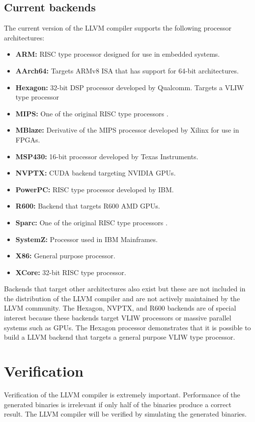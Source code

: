 \subsection{Current backends}
The current version of the LLVM compiler supports the following processor architectures:

\begin{itemize}
  \item \textbf{ARM:} RISC type processor designed for use in embedded systems.
  \item \textbf{AArch64:} Targets ARMv8 ISA that has support for 64-bit architectures.
  \item \textbf{Hexagon:} 32-bit DSP processor developed by Qualcomm. Targets a VLIW type processor
  \item \textbf{MIPS:} One of the original RISC type processors \cite{Hennessy:1983:DHP:892745}.  
  \item \textbf{MBlaze:} Derivative of the MIPS processor developed by Xilinx for use in FPGAs.
  \item \textbf{MSP430:} 16-bit processor developed by Texas Instruments.
  \item \textbf{NVPTX:} CUDA backend targeting NVIDIA GPUs.
  \item \textbf{PowerPC:} RISC type processor developed by IBM.
  \item \textbf{R600:} Backend that targets R600 AMD GPUs.
  \item \textbf{Sparc:} One of the original RISC type processors \cite{4874}.
  \item \textbf{SystemZ:} Processor used in IBM Mainframes.
  \item \textbf{X86:} General purpose processor.
  \item \textbf{XCore:} 32-bit RISC type processor.
\end{itemize}

Backends that target other architectures also exist but these are not included in the distribution of the LLVM compiler and are not actively maintained by the LLVM community. The Hexagon, NVPTX, and R600 backends are of special interest because these backends target VLIW processors or massive parallel systems such as GPUs. The Hexagon processor demonstrates that it is possible to build a LLVM backend that targets a general purpose VLIW type processor.

\section{Verification}
Verification of the LLVM compiler is extremely important. Performance of the generated binaries is irrelevant if only half of the binaries produce a correct result. The LLVM compiler will be verified by simulating the generated binaries. 

